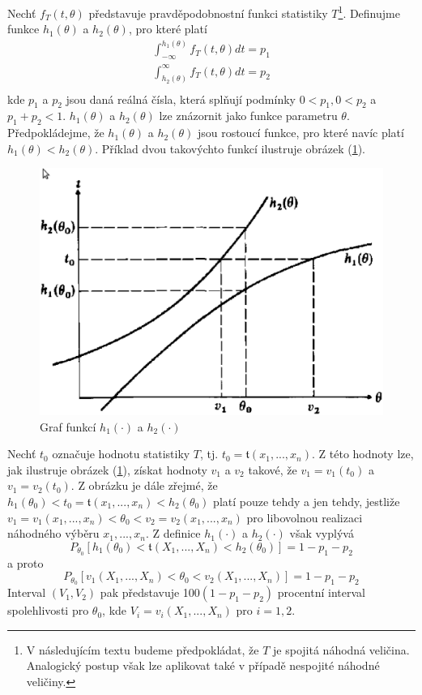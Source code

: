 Nechť $f_T(t, \theta)$ představuje pravděpodobnostní funkci statistiky $T$\footnote{V následujícím textu budeme předpokládat, že $T$ je spojitá náhodná veličina. Analogický postup však lze aplikovat také v případě nespojité náhodné veličiny.}. Definujme funkce $h_1(\theta)$ a $h_2(\theta)$, pro které platí
\begin{gather*}
\int_{-\infty}^{h_1(\theta)}f_T(t, \theta)dt = p_1\\
\int_{h_2(\theta)}^{\infty}f_T(t, \theta)dt = p_2\\
\end{gather*}
kde $p_1$ a $p_2$ jsou daná reálná čísla, která splňují podmínky $0 < p_1, 0 < p_2$ a $p_1 + p_2 < 1$. $h_1(\theta)$ a $h_2(\theta)$ lze znázornit jako funkce parametru $\theta$. Předpokládejme, že $h_1(\theta)$ a $h_2(\theta)$ jsou rostoucí funkce, pro které navíc platí $h_1(\theta) < h_2(\theta)$. Příklad dvou takovýchto funkcí ilustruje obrázek (\ref{h(1)-h(2)}).
\begin{figure}[htp]
\centering
\includegraphics[scale = 0.5]{pictures/h(1)_h(2).eps}
\caption{Graf funkcí $h_1(\cdot)$ a $h_2(\cdot)$}
\label{h(1)-h(2)}
\end{figure}
Nechť $t_0$ označuje hodnotu statistiky $T$, tj. $t_0 = \mathfrak{t}(x_1, ..., x_n)$. Z této hodnoty lze, jak ilustruje obrázek (\ref{h(1)-h(2)}), získat hodnoty $v_1$ a $v_2$ takové, že $v_1 = \mathit{v_1(t_0)}$ a $v_1 = \mathit{v_2(t_0)}$. Z obrázku je dále zřejmé, že $h_1(\theta_0) < t_0 = \mathfrak{t}(x_1, ..., x_n) < h_2(\theta_0)$ platí pouze tehdy a jen tehdy, jestliže $v_1 = \mathit{v_1}(x_1, ..., x_n) < \theta_0 < v_2 = \mathit{v_2}(x_1, ..., x_n)$ pro libovolnou realizaci náhodného výběru $x_1, ..., x_n$. Z definice $h_1(\cdot)$ a $h_2(\cdot)$ však vyplývá
\begin{equation*}
P_{\theta_0}[h_1(\theta_0) < \mathfrak{t}(X_1, ..., X_n) < h_2(\theta_0)] = 1 - p_1 - p_2
\end{equation*}
a proto
\begin{equation*}
P_{\theta_0}[\mathit{v_1}(X_1, ..., X_n) < \theta_0 < \mathit{v_2}(X_1, ..., X_n)] = 1 - p_1 - p_2
\end{equation*}
Interval $(V_1, V_2)$ pak představuje 100$(1 - p_1 - p_2)$ procentní interval spolehlivosti pro $\theta_0$, kde $V_i = \mathit{v_i}(X_1, ..., X_n)$ pro $i = 1, 2$.

